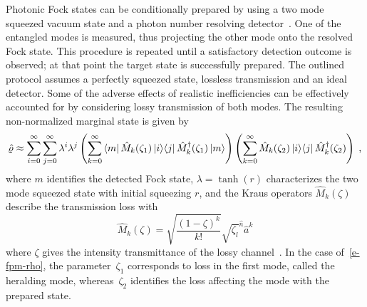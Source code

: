 \documentclass{article}
\begin{document}
Photonic Fock states can be conditionally prepared by using a two mode squeezed vacuum state and a photon number resolving detector~\cite{yukawa2013a,yoshikawa2018,tiedau2019,provaznik2020}. One of the entangled modes is measured, thus projecting the other mode onto the resolved Fock state. This procedure is repeated until a satisfactory detection outcome is observed; at that point the target state is successfully prepared. The outlined protocol assumes a perfectly squeezed state, lossless transmission and an ideal detector. Some of the adverse effects of realistic inefficiencies can be effectively accounted for by considering lossy transmission of both modes. The resulting non-normalized marginal state is given by
%
\begin{equation}\label{e-fpm-rho}
  \hatrho \approx
  \sum_{i = 0}^{\infty} 
  \sum_{j = 0}^{\infty}
    \lambda^{i} \lambda^{j}
    \left(
      \sum_{k = 0}^{\infty}
        \bra{m} \hat{M}_{k} (\zeta_{1}) \ketbra{i}{j} \hat{M}_{k}^{\dagger} (\zeta_{1}) \ket{m}
    \right)
    \left(
      \sum_{k = 0}^{\infty}
        \hat{M}_{k}(\zeta_{2}) \ketbra{i}{j} \hat{M}_{k}^{\dagger} (\zeta_{2})
    \right) \Qc
\end{equation}
%
where $m$ identifies the detected Fock state, $\lambda = \tanh(r)$ characterizes the two mode squeezed state with initial squeezing $r$, and the Kraus operators $\hat{M}_{k} (\zeta) $ describe the transmission loss with
%
\begin{equation}
  \hat{M}_{k} (\zeta) =
    \sqrt{ \frac{(1 - \zeta)^{k}}{k!} } 
    \sqrt{\zeta_{l}}^{\hat{n}} \hat{a}^{k}
\end{equation}
%
where $\zeta$ gives the intensity transmittance of the lossy channel~\cite{ivan2011}. In the case of~\eqref{e-fpm-rho}, the parameter~$\zeta_{1}$ corresponds to loss in the first mode, called the heralding mode, whereas~$\zeta_{2}$ identifies the loss affecting the mode with the prepared state.
\end{document}
